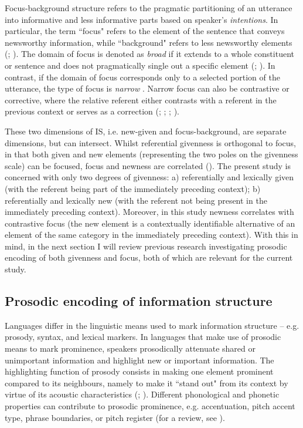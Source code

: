 Focus-background structure refers to the pragmatic partitioning of an utterance into informative and less informative parts based on speaker’s \textit{intentions}. In particular, the term ``focus" refers to the element of the sentence that conveys newsworthy information, while ``background" refers to less newsworthy elements (\citealt{Halliday1967}; \citealt{Kuno1978}). The domain of focus is denoted as \textit{broad} if it extends to a whole constituent or sentence and does not pragmatically single out a specific element (\citealt{Gussenhoven1983}; \citealt{Ladd2008}). In contrast, if the domain of focus corresponds only to a selected portion of the utterance, the type of focus is \textit{narrow} \citep{Ladd1980}. Narrow focus can also be contrastive or corrective, where the relative referent either contrasts with a referent in the previous context or serves as a correction (\citealt{Gussenhoven2008}; \citealt{KlassenEtAl2016}; \citealt{Krifka2008}; \citealt{Vander_klokEtAl2018}).

These two dimensions of IS, i.e. new-given and focus-background, are separate dimensions, but can intersect. Whilst referential givenness is orthogonal to focus, in that both given and new elements (representing the two poles on the givenness scale) can be focused, focus and newness are correlated (\citealt{KüglerCalhoun2020}). The present study is concerned with only two degrees of givenness: a) referentially and lexically given (with the referent being part of the immediately preceding context); b) referentially and lexically new (with the referent not being present in the immediately preceding context). Moreover, in this study newness correlates with contrastive focus (the new element is a contextually identifiable alternative of an element of the same category in the immediately preceding context). With this in mind, in the next section I will review previous research investigating prosodic encoding of both givenness and focus, both of which are relevant for the current study.

\subsection{Prosodic encoding of information structure}
\label{sec:2.1.2}
Languages differ in the linguistic means used to mark information structure – e.g. prosody, syntax, and lexical markers. In languages that make use of prosodic means to mark prominence, speakers prosodically attenuate shared or unimportant information and highlight new or important information. The highlighting function of prosody consists in making one element prominent compared to its neighbours, namely to make it ``stand out" from its context by virtue of its acoustic characteristics (\citealt{CangemiBaumann2020}; \citealt{Terken1991}). Different phonological and phonetic properties can contribute to prosodic prominence, e.g. accentuation, pitch accent type, phrase boundaries, or pitch register (for a review, see \citealt{KüglerCalhoun2020}).

